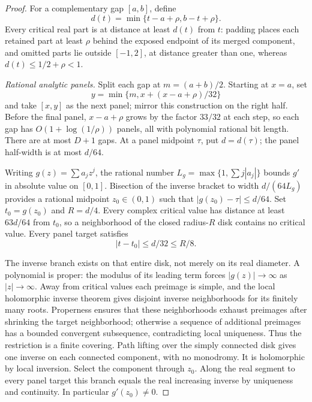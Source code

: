 \begin{proof}
For a complementary gap $[a,b]$, define
\[
                    d(t)=\min\{t-a+\rho,b-t+\rho\}.
\]
Every critical real part is at distance at least $d(t)$ from $t$:
padding places each retained part at least $\rho$ behind the exposed
endpoint of its merged component, and omitted parts lie outside
$[-1,2]$, at distance greater than one, whereas
$d(t)\le1/2+\rho<1$.

\emph{Rational analytic panels.}
Split each gap at $m=(a+b)/2$. Starting at $x=a$, set
\[
                  y=\min\{m,x+(x-a+\rho)/32\}
\]
and take $[x,y]$ as the next panel; mirror this construction on the
right half. Before the final panel, $x-a+\rho$ grows by the factor
$33/32$ at each step, so each gap has $O(1+\log(1/\rho))$ panels, all
with polynomial rational bit length. There are at most $D+1$ gaps. At a panel midpoint
$\tau$, put $d=d(\tau)$; the panel half-width is at most $d/64$.

Writing $g(z)=\sum a_jz^j$, the rational number
$L_g=\max\{1,\sum j|a_j|\}$ bounds $g'$ in absolute value on
$[0,1]$. Bisection of the inverse bracket to width $d/(64L_g)$
provides a rational midpoint $z_0\in(0,1)$ such that
$|g(z_0)-\tau|\le d/64$. Set $t_0=g(z_0)$ and $R=d/4$.
Every complex critical value has distance at least $63d/64$ from
$t_0$, so a neighborhood of the closed radius-$R$ disk contains
no critical value. Every panel target satisfies
\begin{equation}\label{eq:inverse-panel-ratio}
                       |t-t_0|\le d/32\le R/8.
\end{equation}

The inverse branch exists on that entire disk, not merely on its real
diameter. A polynomial is proper: the modulus of its leading term forces
$|g(z)|\to\infty$ as $|z|\to\infty$.
Away from critical values each preimage is simple, and the local
holomorphic inverse theorem gives disjoint inverse neighborhoods for
its finitely many roots. Properness ensures that these neighborhoods
exhaust preimages after shrinking the target neighborhood; otherwise a
sequence of additional preimages has a bounded convergent subsequence,
contradicting local uniqueness. Thus the restriction is a finite
covering. Path lifting over the simply connected disk gives one inverse
on each connected component, with no monodromy. It is holomorphic by
local inversion. Select the component through $z_0$. Along the real
segment to every panel target this branch equals the real increasing
inverse by uniqueness and continuity. In particular $g'(z_0)\ne0$.


\end{proof}
